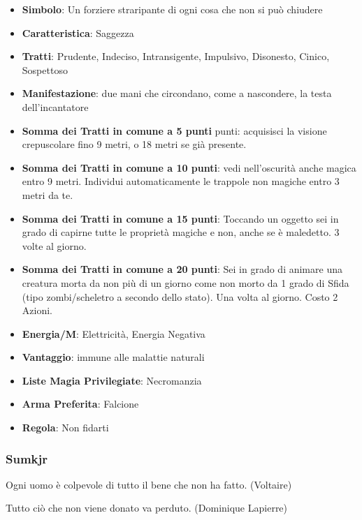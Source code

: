 \begin{multicols}{2}
\begin{itemize}[leftmargin=*] \setlength{\itemsep}{0pt}
\item \textbf{Simbolo}: Un forziere straripante di ogni cosa che non si può chiudere
\item \textbf{Caratteristica}: Saggezza
\item \textbf{Tratti}: Prudente, Indeciso, Intransigente, Impulsivo, Disonesto, Cinico, Sospettoso
\item \textbf{Manifestazione}: due mani che circondano, come a nascondere, la testa dell'incantatore
\item \textbf{Somma dei Tratti in comune a 5 punti} punti: acquisisci la visione crepuscolare fino 9 metri, o 18 metri se già presente.
\item \textbf{Somma dei Tratti in comune a 10 punti}: vedi nell'oscurità anche magica entro 9 metri. Individui automaticamente le trappole non magiche entro 3 metri da te.
\item \textbf{Somma dei Tratti in comune a 15 punti}: Toccando un oggetto sei in grado di capirne tutte le proprietà magiche e non, anche se è maledetto. 3 volte al giorno.
\item \textbf{Somma dei Tratti in comune a 20 punti}: Sei in grado di animare una creatura morta da non più di un giorno come non morto da 1 grado di Sfida (tipo zombi/scheletro a secondo dello stato). Una volta al giorno. Costo 2 Azioni.
\item \textbf{Energia/M}: Elettricità, Energia Negativa
\item \textbf{Vantaggio}: immune alle malattie naturali
\item \textbf{Liste Magia Privilegiate}: Necromanzia
\item \textbf{Arma Preferita}: Falcione
\item \textbf{Regola}: Non fidarti
\end{itemize}

\subsubsection{Sumkjr}\label{sumkjr}\hypertarget{sumkjr}{}

\begin{enfasi}{
Ogni uomo è colpevole di tutto il bene che non ha fatto. (Voltaire)

\medskip

Tutto ciò che non viene donato va perduto. (Dominique Lapierre)

}\end{enfasi}


\end{multicols}
